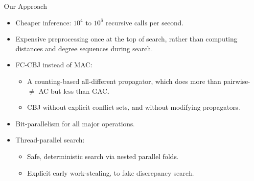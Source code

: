 \documentclass{beamer}
\begin{document}
\begin{frame}{Our Approach}
    \begin{itemize}
        \item \textcolor{uofgthistle}{Cheaper inference}: $10^4$ to $10^6$ recursive calls per second.
        \item Expensive \textcolor{uofgthistle}{preprocessing once} at the top of search, rather
            than computing distances and degree sequences during search.
        \item FC-CBJ instead of MAC:
            \begin{itemize}
                \item A \textcolor{uofgthistle}{counting-based all-different} propagator, which does more
                    than pairwise-$\ne$ AC but less than GAC.
                \item CBJ \textcolor{uofgthistle}{without explicit conflict sets}, and without modifying propagators.
            \end{itemize}
        \item \textcolor{uofgthistle}{Bit-parallelism} for all major operations.
        \item \textcolor{uofgthistle}{Thread-parallel} search:
            \begin{itemize}
                \item Safe, deterministic search via nested parallel folds.
                \item Explicit early work-stealing, to fake discrepancy search.
            \end{itemize}
    \end{itemize}
\end{frame}
\end{document}
